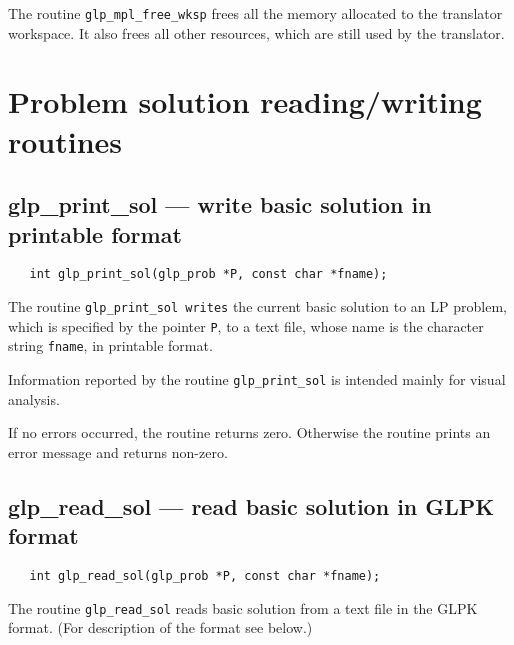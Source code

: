 \description

The routine \verb|glp_mpl_free_wksp| frees all the memory allocated to
the translator workspace. It also frees all other resources, which are
still used by the translator.


\newpage

\section{Problem solution reading/writing routines}

\subsection{glp\_print\_sol --- write basic solution in printable
format}

\synopsis

\begin{verbatim}
   int glp_print_sol(glp_prob *P, const char *fname);
\end{verbatim}

\description

The routine \verb|glp_print_sol writes| the current basic solution to
an LP problem, which is specified by the pointer \verb|P|, to a text
file, whose name is the character string \verb|fname|, in printable
format.

Information reported by the routine \verb|glp_print_sol| is intended
mainly for visual analysis.

\returns

If no errors occurred, the routine returns zero. Otherwise the routine
prints an error message and returns non-zero.

\subsection{glp\_read\_sol --- read basic solution in GLPK format}

\synopsis

\begin{verbatim}
   int glp_read_sol(glp_prob *P, const char *fname);
\end{verbatim}

\description

The routine \verb|glp_read_sol| reads basic solution from a text file
in the GLPK format. (For description of the format see below.)

